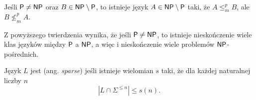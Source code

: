 \begin{theorem}
    Jeśli $\textsf{P} \neq \textsf{NP}$ oraz $B \in \textsf{NP} \setminus \textsf{P}$, to istnieje język $A \in \textsf{NP} \setminus \textsf{P}$ taki, że $A \leq_m^p B$, ale $B \nleq_m^p A$.
\end{theorem}

Z powyższego twierdzenia wynika, że jeśli $\textsf{P} \neq \textsf{NP}$, to istnieje nieskończenie wiele klas języków między $\textsf{P}$ a $\textsf{NP}$, a więc i nieskończenie wiele problemów $\textsf{NP}$-pośrednich.

\begin{definition}\label{d:sparse}
    Język $L$ jest  (ang. \textit{sparse}) jeśli istnieje wielomian $s$ taki, że dla każdej naturalnej liczby $n$
    \[ \left|L \cap \Sigma^{\leq n}\right| \leq s(n). \]
\end{definition}

